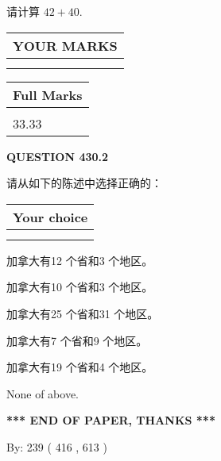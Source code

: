 \documentclass{ctexart}
\begin{document}
  
 
请计算 $ %
42 +  %
40 $.
 

 

 
  
\vspace{0.2in}
  
\noindent\begin{tabular}{|l|}
\hline
 YOUR MARKS  \\
\hline
 \\ 
 \\ 
\hline
\end{tabular}
\hspace{0.05in} \begin{tabular}{|l|}
\hline
 Full Marks  \\
\hline
 \\ 
33.33 \\
\hline
\end{tabular}
{\textbf{\Large{QUESTION
430.2 
}}}
  
  
请从如下的陈述中选择正确的：
  
  
\noindent\hspace{3.0in} \begin{tabular}{|l|}
\hline
Your choice \\
\hline
 \\ 
 \\ 
\hline
\end{tabular}
  
  
 
 
加拿大有12 个省和3 个地区。
 
 
加拿大有10 个省和3 个地区。
 
 
加拿大有25 个省和31 个地区。
 
 
加拿大有7 个省和9 个地区。
 
 
加拿大有19 个省和4 个地区。
 
 
 None of above.
 
 
   
   
 \vspace{0.2in}
 
   
   
   
   
\vspace{1.0in} 
{\textbf{\large{ *** END OF PAPER, THANKS *** }}} 
   
   
\hspace{1.0in} By: 
 239 ( 416 ,  613 )
   
\end{document}
